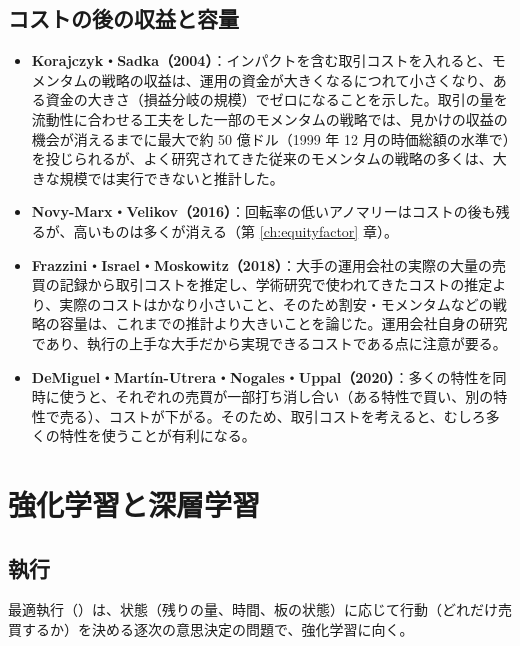 \subsection{コストの後の収益と容量}

\begin{itemize}
\item \textbf{Korajczyk・Sadka（2004）}\cite{korajczyksadka2004}：インパクトを含む取引コストを入れると、モメンタムの戦略の収益は、運用の資金が大きくなるにつれて小さくなり、ある資金の大きさ（損益分岐の規模）でゼロになることを示した。取引の量を流動性に合わせる工夫をした一部のモメンタムの戦略では、見かけの収益の機会が消えるまでに最大で約 50 億ドル（1999 年 12 月の時価総額の水準で）を投じられるが、よく研究されてきた従来のモメンタムの戦略の多くは、大きな規模では実行できないと推計した。
\item \textbf{Novy-Marx・Velikov（2016）}\cite{novymarxvelikov2016}：回転率の低いアノマリーはコストの後も残るが、高いものは多くが消える（第 \ref{ch:equityfactor} 章）。
\item \textbf{Frazzini・Israel・Moskowitz（2018）}\cite{fim2018}：大手の運用会社の実際の大量の売買の記録から取引コストを推定し、学術研究で使われてきたコストの推定より、実際のコストはかなり小さいこと、そのため割安・モメンタムなどの戦略の容量は、これまでの推計より大きいことを論じた。運用会社自身の研究であり、執行の上手な大手だから実現できるコストである点に注意が要る。
\item \textbf{DeMiguel・Martín-Utrera・Nogales・Uppal（2020）}\cite{dmnr2020}：多くの特性を同時に使うと、それぞれの売買が一部打ち消し合い（ある特性で買い、別の特性で売る）、コストが下がる。そのため、取引コストを考えると、むしろ多くの特性を使うことが有利になる。
\end{itemize}

\section{強化学習と深層学習}

\subsection{執行}

最適執行（）は、状態（残りの量、時間、板の状態）に応じて行動（どれだけ売買するか）を決める逐次の意思決定の問題で、強化学習に向く。

